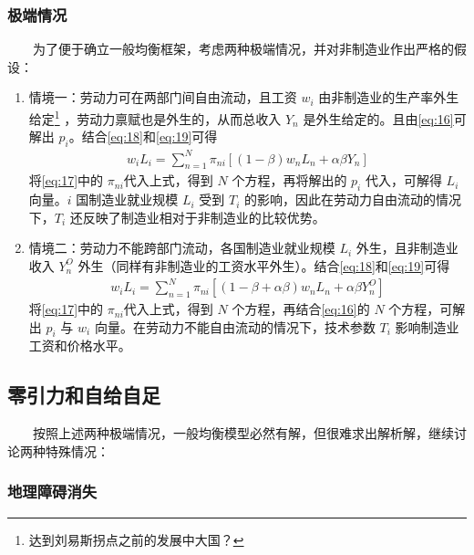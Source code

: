 \documentclass[
]{article}
\begin{document}
\hypertarget{ux6781ux7aefux60c5ux51b5}{%
\subsubsection{极端情况}\label{ux6781ux7aefux60c5ux51b5}}

　　为了便于确立一般均衡框架，考虑两种极端情况，并对非制造业作出严格的假设：

\begin{enumerate}
\def\labelenumi{\arabic{enumi}.}
\item
  情境一：劳动力可在两部门间自由流动，且工资 \(w_i\) 由非制造业的生产率外生给定\footnote{达到刘易斯拐点之前的发展中大国？} ，劳动力禀赋也是外生的，从而总收入 \(Y_n\) 是外生给定的。且由\eqref{eq:16}可解出 \(p_i\)。结合\eqref{eq:18}和\eqref{eq:19}可得
  \begin{align}
  w_{i} L_{i}=\sum_{n=1}^{N} \pi_{n i}\left[(1-\beta) w_{n} L_{n}+\alpha \beta Y_{n}\right] \label{eq:20}
  \end{align}
  将\eqref{eq:17}中的 \(\pi_{ni}\)代入上式，得到 \(N\) 个方程，再将解出的 \(p_i\) 代入，可解得 \(L_{i}\) 向量。\(i\) 国制造业就业规模 \(L_{i}\) 受到 \(T_i\) 的影响，因此在劳动力自由流动的情况下，\(T_i\) 还反映了制造业相对于非制造业的比较优势。
\item
  情境二：劳动力不能跨部门流动，各国制造业就业规模 \(L_{i}\) 外生，且非制造业收入 \(Y_n^O\) 外生（同样有非制造业的工资水平外生）。结合\eqref{eq:18}和\eqref{eq:19}可得
  \begin{align}
  w_{i} L_{i}=\sum_{n=1}^{N} \pi_{n i}\left[(1-\beta+\alpha \beta) w_{n} L_{n}+\alpha \beta Y_{n}^{O}\right] \label{eq:21}
  \end{align}
  将\eqref{eq:17}中的 \(\pi_{ni}\)代入上式，得到 \(N\) 个方程，再结合\eqref{eq:16}的 \(N\) 个方程，可解出 \(p_i\) 与 \(w_{i}\) 向量。在劳动力不能自由流动的情况下，技术参数 \(T_i\) 影响制造业工资和价格水平。
\end{enumerate}

\hypertarget{ux96f6ux5f15ux529bux548cux81eaux7ed9ux81eaux8db3}{%
\subsection{零引力和自给自足}\label{ux96f6ux5f15ux529bux548cux81eaux7ed9ux81eaux8db3}}

　　按照上述两种极端情况，一般均衡模型必然有解，但很难求出解析解，继续讨论两种特殊情况：

\hypertarget{ux5730ux7406ux969cux788dux6d88ux5931}{%
\subsubsection{地理障碍消失}\label{ux5730ux7406ux969cux788dux6d88ux5931}}
\end{document}

